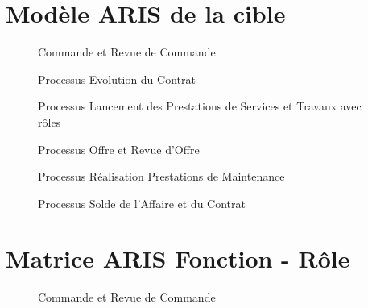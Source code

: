\chapter{Modèle ARIS de la cible}

\begin{figure}[H]
    \label{fig-commande-revue}
    \noindent{}
    \caption{Commande et Revue de Commande}
\end{figure}

\begin{figure}[H]
    \label{fig-evol-contrat}
    \noindent{}
    \caption{Processus Evolution du Contrat}
\end{figure}

\begin{figure}[H]
    \label{fig-lancement}
    \noindent{}
    \caption{Processus Lancement des Prestations de Services et Travaux avec rôles}
\end{figure}

\begin{figure}[H]
    \label{fig-offre-revue}
    \noindent{}
    \caption{Processus Offre et Revue d'Offre}
\end{figure}

\begin{figure}[H]
    \label{fig-real-prest}
    \noindent{}
    \caption{Processus Réalisation Prestations de Maintenance}
\end{figure}

\begin{figure}[H]
    \label{fig-solde-affaire}
    \noindent{}
    \caption{Processus Solde de l'Affaire et du Contrat}
\end{figure}


\chapter{Matrice ARIS Fonction - Rôle}

\begin{figure}[H]
    \label{fig-matrice}
    \noindent{}
    \caption{Commande et Revue de Commande}
\end{figure}


